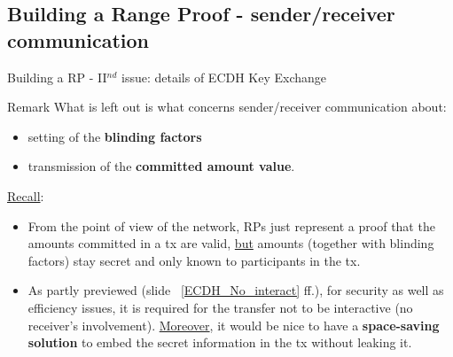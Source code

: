 \documentclass[10.5pt,compress]{beamer}
\begin{document}
\subsection{Building a Range Proof - sender/receiver communication}
\begin{frame}{Building a RP - II$^{nd}$ issue: details of ECDH Key Exchange}
    \begin{alertblock}{Remark} 
        What is left out is what concerns sender/receiver communication about:
        \begin{itemize}
            \item setting of the \textbf{blinding factors}
            \item transmission of the \textbf{committed amount value}.
        \end{itemize}
    \end{alertblock}
    \underline{Recall}:
    \begin{itemize}
        \item From the point of view of the network, RPs just represent a proof that the amounts committed in a tx are valid, \underline{but} amounts (together with blinding factors) stay secret and only known to participants in the tx.
        \item As partly previewed (slide ~\ref{ECDH_No_interact} ff.), for security as well as efficiency issues, it is required for the transfer not to be interactive (no receiver's involvement). %
        \underline{Moreover}, it would be nice to have a \textbf{space-saving solution} to embed the secret information in the tx without leaking it.
    \end{itemize}
\end{frame}
\end{document}
